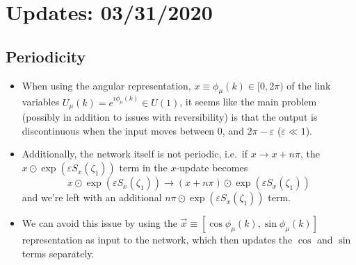 \clearpage
\section{Updates: 03/31/2020}%
\label{sec:updates_2020_03_31}
\subsection{Periodicity}%
\label{subsec:periodicity}
\begin{itemize}
  \item When using the angular representation, \(x \equiv \phi_{\mu}(k) \in [0,
    2\pi)\) of the link variables \(U_{\mu}(k) = e^{i\phi_{\mu}(k)}\in U(1)\),
    it seems like the main problem (possibly in addition to issues with
    reversibility) is that the output is discontinuous when the input moves
    between \(0\), and \(2\pi -\varepsilon\) (\(\varepsilon \ll 1\)).
  \item Additionally, the network itself is not periodic, i.e.\ if \(x
    \longrightarrow x + n\pi\), the \(x\odot \exp(\varepsilon
    S_{x}(\zeta_{1}))\) term in the \(x\)-update becomes
    \begin{equation}
      x\odot \exp(\varepsilon S_{x}(\zeta_{1})) \longrightarrow (x +
      n\pi)\odot\exp(\varepsilon S_{x}(\zeta_{1}))
    \end{equation}
    and we're left with an additional \(n\pi \odot \exp(\varepsilon
    S_{x}(\zeta_{1}))\) term.
  \item We can avoid this issue by using the \(\vec{x} \equiv
    \left[\cos\phi_{\mu}(k), \sin\phi_{\mu}(k)\right]\) representation as input
    to the network, which then updates the \(\cos\) and \(\sin\) terms
    separately.
\end{itemize}
